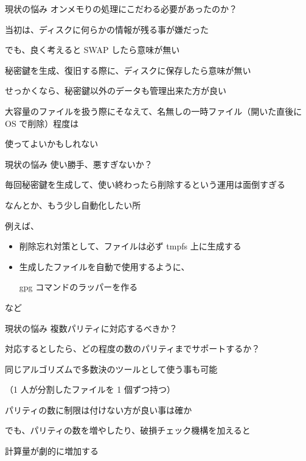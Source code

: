 \begin{frame}{現状の悩み}{}
  オンメモりの処理にこだわる必要があったのか？
  \vspace{1cm}

  当初は、ディスクに何らかの情報が残る事が嫌だった

  でも、良く考えると SWAP したら意味が無い

  秘密鍵を生成、復旧する際に、ディスクに保存したら意味が無い
  \vspace{1cm}

  せっかくなら、秘密鍵以外のデータも管理出来た方が良い

  大容量のファイルを扱う際にそなえて、名無しの一時ファイル（開いた直後に OS で削除）程度は

  使ってよいかもしれない
\end{frame}

\begin{frame}{現状の悩み}{}
  使い勝手、悪すぎないか？
  \vspace{1cm}

  毎回秘密鍵を生成して、使い終わったら削除するという運用は面倒すぎる

  なんとか、もう少し自動化したい所

  例えば、
  \begin{itemize}
  \item 削除忘れ対策として、ファイルは必ず tmpfs 上に生成する
  \item 生成したファイルを自動で使用するように、

    gpg コマンドのラッパーを作る
  \end{itemize}
  など

\end{frame}

\begin{frame}{現状の悩み}{}
  複数パリティに対応するべきか？
  \vspace{1cm}

  対応するとしたら、どの程度の数のパリティまでサポートするか？
  \vspace{1cm}

  同じアルゴリズムで多数決のツールとして使う事も可能

  （1 人が分割したファイルを 1 個ずつ持つ）

  パリティの数に制限は付けない方が良い事は確か

  でも、パリティの数を増やしたり、破損チェック機構を加えると

  計算量が劇的に増加する
\end{frame}

